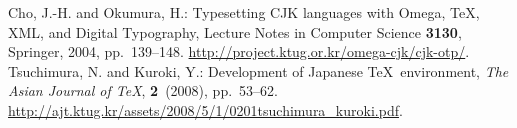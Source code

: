 \documentclass[papersize]{jsarticle}
\begin{document}


\begin{thebibliography}{9}
         Cho, J.-H. and Okumura, H.:
         Typesetting CJK languages with Omega, \TeX, XML, and Digital Typography,
         Lecture Notes in Computer Science \textbf{3130}, Springer, 2004,
         pp.~139--148. \newline\url{http://project.ktug.or.kr/omega-cjk/cjk-otp/}.
         Tsuchimura, N. and Kuroki, Y.:
         Development of Japanese \TeX\ environment,
         \textit{The Asian Journal of \TeX}, \textbf{2}~(2008), pp.~53--62.
         \newblock\url{http://ajt.ktug.kr/assets/2008/5/1/0201tsuchimura_kuroki.pdf}.
\end{thebibliography}
\end{document}
